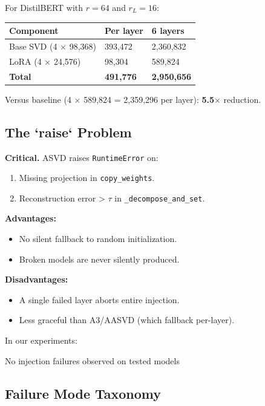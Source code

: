 For DistilBERT with $r = 64$ and $r_L = 16$:

\begin{table}[H]
\centering
\small
\begin{tabular}{lll}
\toprule
\textbf{Component} & \textbf{Per layer} & \textbf{6 layers} \\
\midrule
Base SVD (4 $\times$ 98,368) & 393,472 & 2,360,832 \\
LoRA (4 $\times$ 24,576) & 98,304 & 589,824 \\
\textbf{Total} & \textbf{491,776} & \textbf{2,950,656} \\
\bottomrule
\end{tabular}
\end{table}

Versus baseline (4 $\times$ 589,824 = 2,359,296 per layer): \textbf{5.5$\times$} 
reduction.

\subsection{The `raise` Problem}

\textbf{Critical.} ASVD raises \texttt{RuntimeError} on:

\begin{enumerate}
\item Missing projection in \texttt{copy\_weights}.
\item Reconstruction error > $\tau$ in \texttt{\_decompose\_and\_set}.

\end{enumerate}
\textbf{Advantages:}
\begin{itemize}
\item No silent fallback to random initialization.
\item Broken models are never silently produced.

\end{itemize}
\textbf{Disadvantages:}
\begin{itemize}
\item A single failed layer aborts entire injection.
\item Less graceful than A3/AASVD (which fallback per-layer).

\end{itemize}
In our experiments:

No injection failures observed on tested models

\subsection{Failure Mode Taxonomy}

